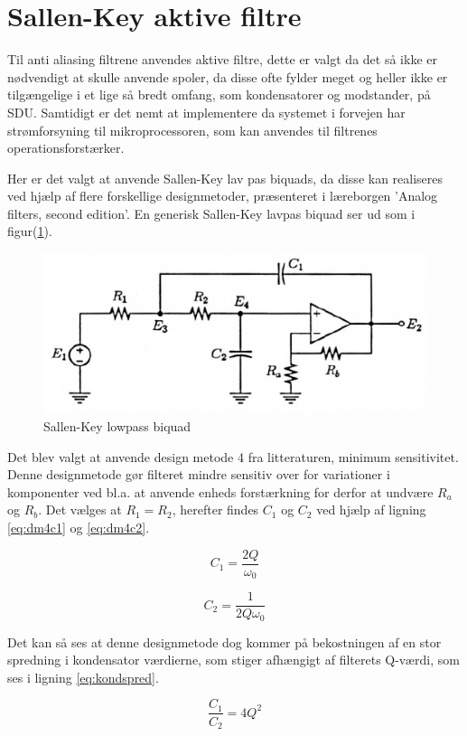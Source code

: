 \section{Sallen-Key aktive filtre}

Til anti aliasing filtrene anvendes aktive filtre, dette er valgt da det så ikke er
nødvendigt at skulle anvende spoler, da disse ofte fylder meget og heller ikke er
tilgængelige i et lige så bredt omfang, som kondensatorer og modstander, på SDU.
Samtidigt er det nemt at implementere da systemet i forvejen har strømforsyning til
mikroprocessoren, som kan anvendes til filtrenes operationsforstærker.

Her er det valgt at anvende Sallen-Key lav pas biquads,
da disse kan realiseres ved hjælp af flere forskellige designmetoder, præsenteret 
i læreborgen 'Analog filters, second edition'\cite{KendallSu}.
En generisk Sallen-Key lavpas biquad ser ud som i figur(\ref{fig:sklpbq}).

\begin{figure}[H]
	\centering
	\includegraphics[width=\textwidth]{billeder/sklpbq}
	\caption{Sallen-Key lowpass biquad \cite{KendallSu}}
	\label{fig:sklpbq}
\end{figure}

Det blev valgt at anvende design metode 4 fra litteraturen, minimum sensitivitet.
Denne designmetode gør filteret mindre sensitiv over for variationer i komponenter ved bl.a.
at anvende enheds forstærkning for derfor at undvære $R_a$ og $R_b$.
Det vælges at $R_1 = R_2$, herefter findes $C_1$ og $C_2$ ved hjælp af ligning \ref{eq:dm4c1} og \ref{eq:dm4c2}.

\vspace{15pt}

\begin{minipage}{0.5\linewidth}
	\begin{equation}
	\label{eq:dm4c1}
		C_1 = \frac{2Q}{\omega_0}
	\end{equation}
\end{minipage}
\begin{minipage}{0.5\linewidth}
	\begin{equation}
	\label{eq:dm4c2}
	C_2 = \frac{1}{2Q\omega_0}
	\end{equation}
\end{minipage}

\vspace{15pt}

Det kan så ses at denne designmetode dog kommer på bekostningen af en stor spredning i
kondensator værdierne, som stiger afhængigt af filterets Q-værdi, som ses i ligning
\ref{eq:kondspred}.

\begin{equation}
\label{eq:kondspred}
	\frac{C_1}{C_2} = 4Q^2
\end{equation}



